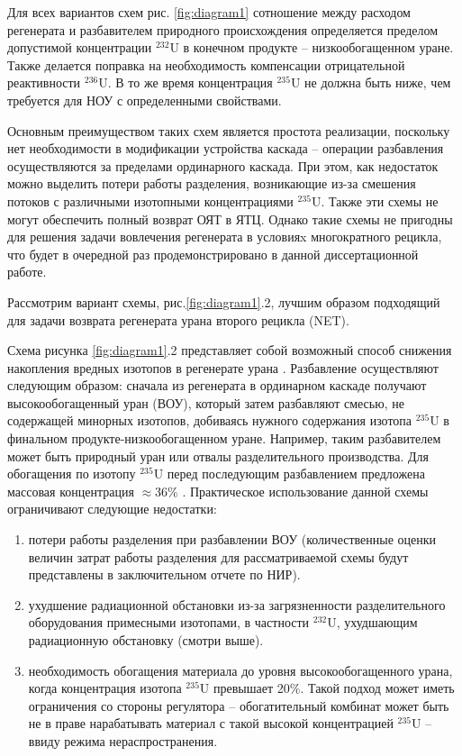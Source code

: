 Для всех вариантов схем рис. \ref{fig:diagram1} сотношение между расходом регенерата и разбавителем природного происхождения определяется пределом допустимой концентрации $^{232}$U в конечном продукте -- низкообогащенном уране. Также делается поправка на необходимость компенсации отрицательной реактивности $^{236}$U. В то же время концентрация $^{235}$U не должна быть ниже, чем требуется для НОУ с определенными свойствами.

Основным преимуществом таких схем является простота реализации, поскольку нет необходимости в модификации устройства каскада -- операции разбавления осуществляются за пределами  ординарного каскада.
При этом, как недостаток можно выделить потери работы разделения, возникающие из-за смешения потоков с различными изотопными концентрациями $^{235}$U.
Также эти схемы не могут обеспечить полный возврат ОЯТ в ЯТЦ.
Однако такие схемы не пригодны для решения задачи вовлечения регенерата в условияx многократного рецикла, что будет в очередной раз продемонстрировано в данной диссертационной работе.

Рассмотрим вариант схемы, рис.\ref{fig:diagram1}.2, лучшим образом подходящий для задачи возврата регенерата урана второго рецикла (NET).

Схема рисунка \ref{fig:diagram1}.2 представляет собой возможный способ снижения накопления вредных изотопов в регенерате урана \cite{SposobIzotopnogoVosstanovleniyaa}. Разбавление осуществляют следующим образом: сначала из регенерата в ординарном каскаде получают высокообогащенный уран (ВОУ), который затем разбавляют смесью, не содержащей минорных изотопов, добиваясь нужного содержания изотопа $^{235}$U в финальном продукте-низкообогащенном уране. Например, таким разбавителем может быть природный уран или отвалы разделительного производства. Для обогащения по изотопу $^{235}$U перед последующим разбавлением предложена массовая концентрация $\approx$36\% \cite{SposobIzotopnogoVosstanovleniyaa}. Практическое использование данной схемы ограничивают следующие недостатки: 
\begin{enumerate}
  \item потери работы разделения при разбавлении ВОУ (количественные оценки величин затрат работы разделения для рассматриваемой схемы будут представлены в заключительном отчете по НИР).
  \item ухудшение радиационной обстановки из-за загрязненности разделительного оборудования примесными изотопами, в частности $^{232}$U, ухудшающим радиационную обстановку (смотри выше).
  \item необходимость обогащения материала до уровня высокообогащенного урана, когда концентрация изотопа $^{235}$U превышает 20\%. Такой подход может иметь ограничения со стороны регулятора -- обогатительный комбинат может быть не в праве нарабатывать материал с такой высокой концентрацией $^{235}$U -- ввиду режима нераспространения.
\end{enumerate}

